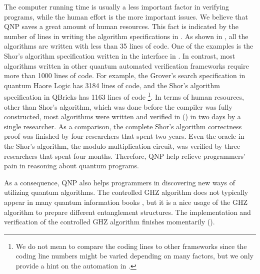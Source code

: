 The computer running time is usually a less important factor in verifying programs, while the human effort is the more important issues. We believe that QNP saves a great amount of human resources. This fact is indicated by the number of lines in writing the algorithm specifications in \qafny. As shown in , all the algorithms are written with less than 35 lines of code. One of the examples is the Shor's algorithm specification written in the \qafny interface in .
In contrast, most algorithms written in other quantum automated verification frameworks require more than 1000 lines of code.
For example, the Grover's search specification in quantum Haore Logic \cite{qhoreusage} has 3184 lines of code, and the Shor's algorithm specification in QBricks \cite{qbricks} has 1163 lines of code \footnote{We do not mean to compare the coding lines to other frameworks since the coding line numbers might be varied depending on many factors, but we only provide a hint on the automation in \qafny.}.
In terms of human resources, other than Shor's algorithm, which was done before the \qafny compiler was fully constructed, most algorithms were written and verified in \qafny () in two days by a single researcher. 
As a comparison, the complete Shor's algorithm correctness proof \cite{shorsprove} was finished by four researchers that spent two years. Even the oracle in the Shor's algorithm, the modulo multiplication circuit, was verified by three researchers that spent four months. Therefore, QNP help relieve programmers' pain in reasoning about quantum programs.

As a consequence, QNP also helps programmers in discovering new ways of utilizing quantum algorithms. The controlled GHZ algorithm does not typically appear in many quantum information books \cite{mike-and-ike}, but it is a nice usage of the GHZ algorithm to prepare different entanglement structures. The implementation and verification of the controlled GHZ algorithm finishes momentarily ().










